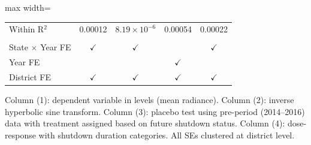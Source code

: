 \begin{table}[htbp]
\begin{adjustbox}{max width=\textwidth}
\begin{tabular}{lcccc}
      Within R$^2$            & 0.00012       & $8.19\times 10^{-6}$  & 0.00054       & 0.00022\\  
       \\
      State $\times$ Year FE  & $\checkmark$  & $\checkmark$          &               & $\checkmark$\\   
      Year FE                 &               &                       & $\checkmark$  & \\  
      District FE             & $\checkmark$  & $\checkmark$          & $\checkmark$  & $\checkmark$\\   
      \bottomrule
   \end{tabular}
\end{adjustbox}
   
   \par \raggedright 
   Column (1): dependent variable in levels (mean radiance). Column (2): inverse hyperbolic sine transform. Column (3): placebo test using pre-period (2014--2016) data with treatment assigned based on future shutdown status. Column (4): dose-response with shutdown duration categories. All SEs clustered at district level.
\end{table}


